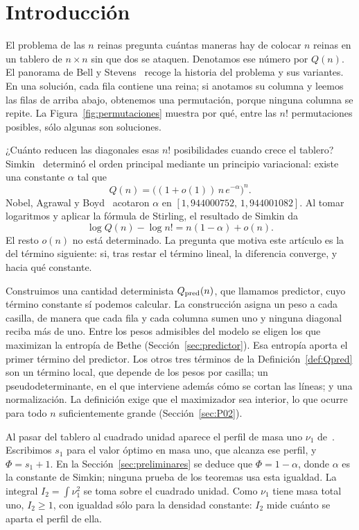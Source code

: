 \section{Introducción}\label{sec:intro}

El problema de las $n$ reinas pregunta cuántas maneras hay de colocar $n$ reinas en un tablero de
$n\times n$ sin que dos se ataquen. Denotamos ese número por $Q(n)$. El panorama de Bell y
Stevens~\cite{BellStevens} recoge la historia del problema y sus variantes. En una solución, cada fila
contiene una reina; si anotamos su columna y leemos las filas de arriba abajo, obtenemos una
permutación, porque ninguna columna se repite. La Figura~\ref{fig:permutaciones} muestra por qué,
entre las $n!$ permutaciones posibles, sólo algunas son soluciones.



¿Cuánto reducen las diagonales esas $n!$ posibilidades cuando crece el tablero?
Simkin~\cite[Teorema~1.1]{Simkin} determinó el orden principal mediante un principio variacional:
existe una constante $\alpha$ tal que
\[
 Q(n)=\bigl((1+o(1))\,n\,e^{-\alpha}\bigr)^n .
\]
Nobel, Agrawal y Boyd~\cite{NAB} acotaron $\alpha$ en $[1{,}944000752,\,1{,}944001082]$.
Al tomar logaritmos y aplicar la fórmula de Stirling, el resultado de Simkin da
\[
 \log Q(n)-\log n!=n(1-\alpha)+o(n).
\]
El resto $o(n)$ no está determinado. La pregunta que motiva este artículo es la del término
siguiente: si, tras restar el término lineal, la diferencia converge, y hacia qué constante.

Construimos una cantidad determinista $Q_{\rm pred}(n)$, que llamamos predictor, cuyo término
constante sí podemos calcular. La construcción asigna un peso a cada casilla, de manera que cada fila
y cada columna sumen uno y ninguna diagonal reciba más de uno. Entre los pesos admisibles del modelo
se eligen los que maximizan la entropía de Bethe (Sección~\ref{sec:predictor}). Esa entropía aporta
el primer término del predictor. Los otros tres términos de la Definición~\ref{def:Qpred} son un
término local, que depende de los pesos por casilla; un pseudodeterminante, en el que interviene además cómo
se cortan las líneas; y una normalización. La definición exige que el maximizador sea interior, lo
que ocurre para todo $n$ suficientemente grande (Sección~\ref{sec:P02}).

Al pasar del tablero al cuadrado unidad aparece el perfil de masa uno $\nu_1$ de~\cite{Perfil}.
Escribimos $s_1$ para el valor óptimo en masa uno, que alcanza ese perfil, y $\Phi=s_1+1$. En la
Sección~\ref{sec:preliminares} se deduce que $\Phi=1-\alpha$, donde $\alpha$ es la constante de
Simkin; ninguna prueba de los teoremas usa esta igualdad. La integral $I_2=\int\nu_1^2$ se toma sobre
el cuadrado unidad. Como $\nu_1$ tiene masa total uno, $I_2\ge1$, con igualdad sólo para la densidad
constante: $I_2$ mide cuánto se aparta el perfil de ella.

